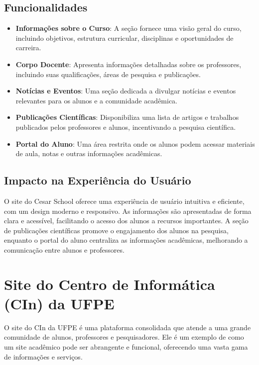 \documentclass[a4paper,12pt]{report}
\begin{document}
\subsection{Funcionalidades} 
    \begin{itemize} 

    \item \textbf{Informações sobre o Curso}: A seção fornece uma visão geral do curso, incluindo objetivos, estrutura curricular, disciplinas e oportunidades de carreira. 

    \item \textbf{Corpo Docente}: Apresenta informações detalhadas sobre os professores, incluindo suas qualificações, áreas de pesquisa e publicações. 

    \item \textbf{Notícias e Eventos}: Uma seção dedicada a divulgar notícias e eventos relevantes para os alunos e a comunidade acadêmica. 

    \item \textbf{Publicações Científicas}: Disponibiliza uma lista de artigos e trabalhos publicados pelos professores e alunos, incentivando a pesquisa científica. 

    \item \textbf{Portal do Aluno}: Uma área restrita onde os alunos podem acessar materiais de aula, notas e outras informações acadêmicas. 

\end{itemize} 

\subsection{Impacto na Experiência do Usuário} 
O site do Cesar School oferece uma experiência de usuário intuitiva e eficiente, com um design moderno e responsivo. As informações são apresentadas de forma clara e acessível, facilitando o acesso dos alunos a recursos importantes. A seção de publicações científicas promove o engajamento dos alunos na pesquisa, enquanto o portal do aluno centraliza as informações acadêmicas, melhorando a comunicação entre alunos e professores. 

\section{Site do Centro de Informática (CIn) da UFPE} 
O site do CIn da UFPE é uma plataforma consolidada que atende a uma grande comunidade de alunos, professores e pesquisadores. Ele é um exemplo de como um site acadêmico pode ser abrangente e funcional, oferecendo uma vasta gama de informações e serviços. 
\end{document}
